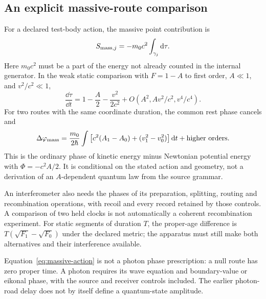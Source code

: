 \subsection{An explicit massive-route comparison}
For a declared test-body action, the massive point contribution is
\begin{equation}
 S_{{\rm mass},j}=-m_0c^2\int_{\gamma_j}\mathrm d\tau.
 \label{eq:massive-action}
\end{equation}
Here $m_0c^2$ must be a part of the energy not already counted in the internal generator. In the weak static comparison with $F=1-A$ to first order, $A\ll1$, and $v^2/c^2\ll1$,
\begin{equation}
 \frac{\dd\tau}{\dd t}
 =1-\frac A2-\frac{v^2}{2c^2}
    +O(A^2,Av^2/c^2,v^4/c^4).
\end{equation}
For two routes with the same coordinate duration, the common rest phase cancels and
\begin{equation}
 \Delta\varphi_{\rm mass}
 =\frac{m_0}{2\hbar}\int
       \left[c^2(A_1-A_0)+(v_1^2-v_0^2)\right]\mathrm d t
       +\text{higher orders}.
\end{equation}
This is the ordinary phase of kinetic energy minus Newtonian potential energy with $\Phi=-c^2A/2$. It is conditional on the stated action and geometry, not a derivation of an $A$-dependent quantum law from the source grammar.

An interferometer also needs the phases of its preparation, splitting, routing and recombination operations, with recoil and every record retained by those controls. A comparison of two held clocks is not automatically a coherent recombination experiment. For static segments of duration $T$, the proper-age difference is $T(\sqrt{F_1}-\sqrt{F_0})$ under the declared metric; the apparatus must still make both alternatives and their interference available.

Equation~\eqref{eq:massive-action} is not a photon phase prescription: a null route has zero proper time. A photon requires its wave equation and boundary-value or eikonal phase, with the source and receiver controls included. The earlier photon-road delay does not by itself define a quantum-state amplitude.

